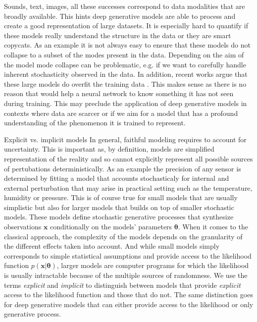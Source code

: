 Sounds, text, images, all these successes correspond to data modalities that are broadly available. This hints deep generative models are able to process and create a good representation of large datasets. It is especially hard to quantify if these models really understand the structure in the data or they are smart copycats. As an example it is not always easy to ensure that these models do not collapse to a subset of the modes present in the data. Depending on the aim of the model mode collapse can be problematic, e.g. if we want to carefully handle inherent stochasticity observed in the data. In addition, recent works argue that these large models do overfit the training data \citep{overfit_dalle, gpt3}.
This makes sense as there is no reason that would help a neural network to know something it has not seen during training. This may preclude the application of deep generative models in contexts where data are scarcer or if we aim for a model that has a profound understanding of the phenomenon it is trained to represent.


\begin{side_note}{Explicit vs. implicit models}
  In general, faithful modeling requires to account for uncertainty. This is important as, by definition, models are simplified representation of the reality and so cannot explicitly represent all possible sources of pertubations deterministically. As an example the precision of any sensor is determined by fitting a model that accounts stochasticaly for internal and external perturbation that may arise in practical setting such as the temperature, humidity or pressure. This is of course true for small models that are usually simplistic but also for larger models that builds on top of smaller stochastic models. These models define stochastic generative processes that synthesize observations $\mathbf{x}$ conditionally on the models' parameters $\mathbf{\theta}$. When it comes to the classical approach, the complexity of the models depends on the granularity of the different effects taken into account. And while small models simply corresponds to simple statistical assumptions and provide access to the likelihood function $p(\mathbf{x}|\mathbf{\theta})$, larger models are computer programs for which the likelihood is usually intractable because of the multiple sources of randomness. We use the terms \textit{explicit} and \textit{implicit} to distinguish between models that provide \textit{explicit} access to the likelihood function and those that do not. The same distinction goes for deep generative models that can either provide access to the likelihood or only generative process.
\end{side_note}
